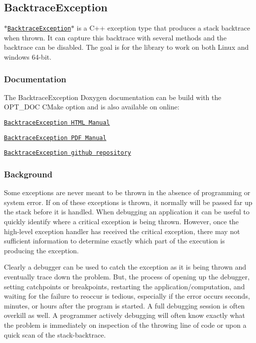 \href{https://travis-ci.org/markjolah/BacktraceException}{\tt } \subsection*{Backtrace\-Exception}

\href{https://markjolah.github.io/BacktraceException/classbacktrace__exception_1_1BacktraceException.html}{\tt $\ast$\-Backtrace\-Exception$\ast$} is a C++ exception type that produces a stack backtrace when thrown. It can capture this backtrace with several methods and the backtrace can be disabled. The goal is for the library to work on both Linux and windows 64-\/bit.

\subsubsection*{Documentation}

The Backtrace\-Exception Doxygen documentation can be build with the {\ttfamily O\-P\-T\-\_\-\-D\-O\-C} C\-Make option and is also available on online\-:
\begin{DoxyItemize}
\item \href{https://markjolah.github.io/BacktraceException/index.html}{\tt Backtrace\-Exception H\-T\-M\-L Manual}
\item \href{https://markjolah.github.io/BacktraceException/pdf/BacktraceException-0.2-reference.pdf}{\tt Backtrace\-Exception P\-D\-F Manual}
\item \href{https://github.com/markjolah/BacktraceException}{\tt Backtrace\-Exception github repository}
\end{DoxyItemize}

\subsubsection*{Background}

Some exceptions are never meant to be thrown in the absence of programming or system error. If on of these exceptions is thrown, it normally will be passed far up the stack before it is handled. When debugging an application it can be useful to quickly identify where a critical exception is being thrown. However, once the high-\/level exception handler has received the critical exception, there may not sufficient information to determine exactly which part of the execution is producing the exception.

Clearly a debugger can be used to catch the exception as it is being thrown and eventually trace down the problem. But, the process of opening up the debugger, setting catchpoints or breakpoints, restarting the application/computation, and waiting for the failure to reoccur is tedious, especially if the error occurs seconds, minutes, or hours after the program is started. A full debugging session is often overkill as well. A programmer actively debugging will often know exactly what the problem is immediately on inspection of the throwing line of code or upon a quick scan of the stack-\/backtrace.

